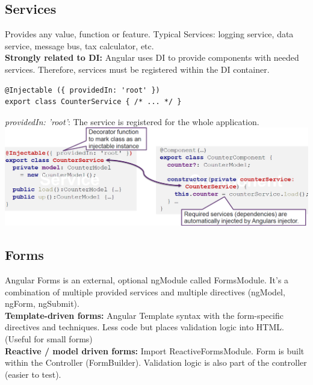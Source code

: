 \subsection{Services}
Provides any value, function or feature.
Typical Services: logging service, data service, message bus, tax calculator, etc.\\
\textbf{Strongly related to DI:} Angular uses DI to provide components with needed services.
Therefore, services must be registered within the DI container.
\begin{lstlisting}
@Injectable ({ providedIn: 'root' })
export class CounterService { /* ... */ }
\end{lstlisting}
\textit{providedIn: 'root'}: The service is registered for the whole application.
\includegraphics[width=\linewidth]{img/angular_services.png}


\subsection{Forms}
Angular Forms is an external, optional ngModule called FormsModule.
It's a combination of multiple provided services and multiple directives (ngModel, ngForm, ngSubmit).\\
\textbf{Template-driven forms:} Angular Template syntax with the form-specific directives and techniques.
Less code but places validation logic into HTML. (Useful for small forms)\\
\textbf{Reactive / model driven forms:} Import ReactiveFormsModule.
Form is built within the Controller (FormBuilder).
Validation logic is also part of the controller (easier to test).

